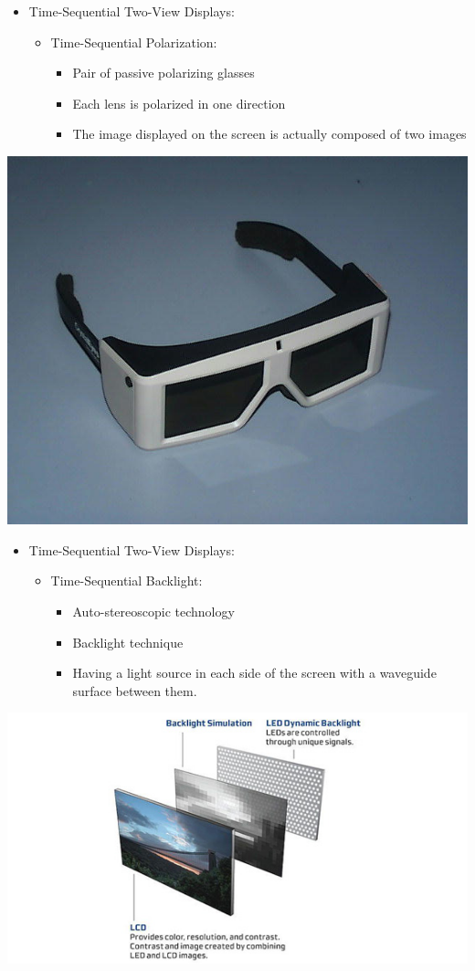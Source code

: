 \begin{frame}		  	
  \begin{itemize}
  \item Time-Sequential Two-View Displays:
    \begin{itemize}
    \item Time-Sequential Polarization:
      \begin{itemize}
      \item Pair of passive polarizing glasses
      \item Each lens is polarized in one direction
      \item The image displayed on the screen is actually composed of two images
      \end{itemize}
    \end{itemize}
  \end{itemize}
  \includegraphics[keepaspectratio,height=.2\linewidth]{2.jpg}
\end{frame}

\begin{frame}
  \begin{itemize}
  \item Time-Sequential Two-View Displays:
    \begin{itemize}
    \item Time-Sequential Backlight:
      \begin{itemize}
      \item Auto-stereoscopic technology
      \item Backlight technique
      \item Having a light source in each side of the screen with a waveguide surface between them.

      \end{itemize}
    \end{itemize}
  \end{itemize}
  \includegraphics[keepaspectratio,height=.2\linewidth]{3.jpg}
\end{frame}

